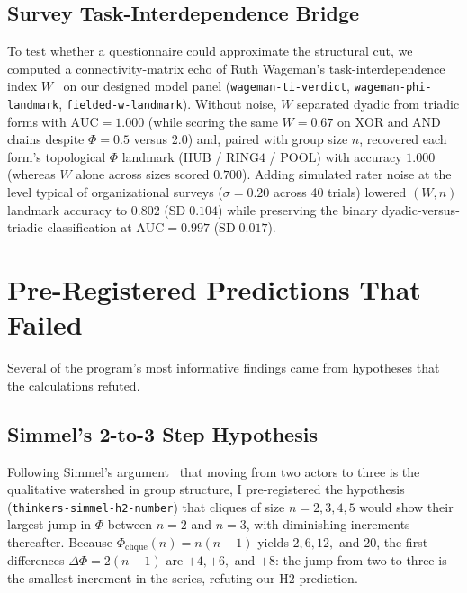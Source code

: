 \documentclass[11pt,a4paper]{article}
\begin{document}
\subsection{Survey Task-Interdependence Bridge}

To test whether a questionnaire could approximate the structural cut, we computed a connectivity-matrix echo of Ruth Wageman's task-interdependence index $W$~\cite{wageman1995interdependence} on our designed model panel (\texttt{wageman-ti-verdict}, \texttt{wageman-phi-landmark}, \texttt{fielded-w-landmark}). Without noise, $W$ separated dyadic from triadic forms with $\mathrm{AUC} = 1.000$ (while scoring the same $W = 0.67$ on $\mathrm{XOR}$ and $\mathrm{AND}$ chains despite $\Phi = 0.5$ versus $2.0$) and, paired with group size $n$, recovered each form's topological $\Phi$ landmark ($\mathrm{HUB}$ / $\mathrm{RING4}$ / $\mathrm{POOL}$) with accuracy $1.000$ (whereas $W$ alone across sizes scored $0.700$). Adding simulated rater noise at the level typical of organizational surveys ($\sigma = 0.20$ across 40 trials) lowered $(W, n)$ landmark accuracy to $0.802$ ($\mathrm{SD}\;0.104$) while preserving the binary dyadic-versus-triadic classification at $\mathrm{AUC} = 0.997$ ($\mathrm{SD}\;0.017$).

\section{Pre-Registered Predictions That Failed}

Several of the program's most informative findings came from hypotheses that the calculations refuted.

\subsection{Simmel's 2-to-3 Step Hypothesis}

Following Simmel's argument~\cite{simmel1902number1,simmel1908soziologie} that moving from two actors to three is the qualitative watershed in group structure, I pre-registered the hypothesis (\texttt{thinkers-simmel-h2-number}) that cliques of size $n = 2, 3, 4, 5$ would show their largest jump in $\Phi$ between $n = 2$ and $n = 3$, with diminishing increments thereafter. Because $\Phi_{\mathrm{clique}}(n) = n(n - 1)$ yields $2, 6, 12,$ and $20$, the first differences $\Delta\Phi = 2(n - 1)$ are $+4, +6,$ and $+8$: the jump from two to three is the smallest increment in the series, refuting our H2 prediction.
\end{document}
